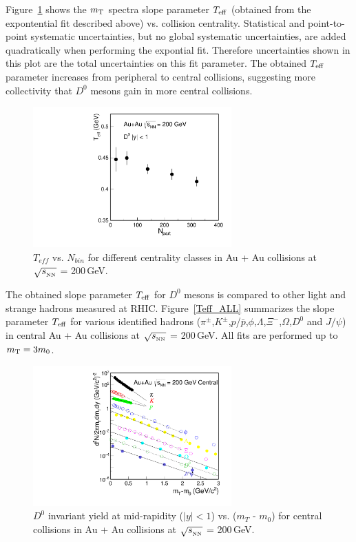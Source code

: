 Figure~\ref{Teff_D0} shows the $m_{\rm T}$ spectra slope parameter $T_{\rm eff}$ (obtained from the expontential fit described above) vs. collision centrality. Statistical and point-to-point systematic uncertainties, but no global systematic uncertainties, are added quadratically when performing the expontial fit. Therefore uncertainties shown in this plot are the total uncertainties on this fit parameter. The obtained $T_{\rm eff}$ parameter increases from peripheral to central collisions, suggesting more collectivity that $D^0$ mesons gain in more central collisions. 

\begin{figure}
\centering
\includegraphics[width=0.68\textwidth]{figure/Run14_D0HFT/Teff_D0.pdf}
\caption{$T_{eff}$ vs. $N_{bin}$ for different centrality classes in Au + Au collisions at $\sqrt{s_{_{\rm NN}}}$ = 200\,GeV.}
\label{Teff_D0} 
\end{figure}

The obtained slope parameter $T_{\rm eff}$ for $D^0$ mesons is compared to other light and strange hadrons measured at RHIC. %
Figure~\ref{Teff_ALL} summarizes the slope parameter $T_{\rm eff}$ for various identified hadrons ($\pi^{\pm}$,$K^{\pm}$,$p$/$\bar{p}$,$\phi$,$\Lambda$,$\Xi^-$,$\Omega$,$D^0$ and $J/\psi$) in central Au + Au collisions at $\sqrt{s_{_{\rm NN}}}$ = 200\,GeV. All fits are performed up to $m_{\rm T} = 3m_{0}$.


\begin{figure}
\centering
\includegraphics[width=0.68\textwidth]{figure/Run14_D0HFT/mTFit_ALL.pdf}
\caption{$D^{0}$ invariant yield at mid-rapidity ($|y|<1$) vs. ($m_{T}$ - $m_{0}$) for central collisions in Au + Au collisions at $\sqrt{s_{_{\rm NN}}}$ = 200\,GeV.}
\label{mTFit_ALL} 
\end{figure}

